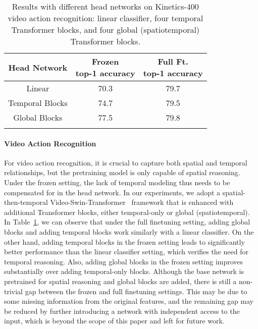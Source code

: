 \documentclass{article}
\begin{document}
\begin{table}[h]
        \centering
\addtolength{\tabcolsep}{3.0pt}
        \begin{tabular}{c|cc}
            \Xhline{1.0pt}
            Head Network& \makecell{Frozen\\top-1 accuracy} & \makecell{Full Ft.\\top-1 accuracy}\\
            \hline
            Linear & 70.3 & 79.7 \\
             Temporal Blocks & 74.7 & 79.5 \\
             Global Blocks & 77.5 & 79.8 \\
          \Xhline{1.0pt}  
       \end{tabular}
       \caption{Results with different head networks on Kinetics-400 video action recognition: linear classifier, four temporal Transformer blocks, and four global (spatiotemporal) Transformer blocks.}
    \label{tab:param_at_head_k400}
\end{table}

\paragraph{Video Action Recognition}
For video action recognition, it is crucial to capture both spatial and temporal relationships, but the pretraining model is only capable of spatial reasoning. Under the frozen setting, the lack of temporal modeling thus needs to be compensated for in the head network. In our experiments, we adopt a spatial-then-temporal Video-Swin-Transformer~\cite{liu2021video} framework that is enhanced with additional Transformer blocks, either temporal-only or global (spatiotemporal). In Table~\ref{tab:param_at_head_k400}, we can observe that under the full finetuning setting, adding global blocks and adding temporal blocks work similarly with a linear classifier. On the other hand, adding temporal blocks in the frozen setting leads to significantly better performance than the linear classifier setting, which verifies the need for temporal reasoning. Also, adding global blocks in the frozen setting improves substantially over adding temporal-only blocks. Although the base network is pretrained for spatial reasoning and global blocks are added, there is still a non-trivial gap between the frozen and full finetuning settings. This may be due to some missing information from the original features, and the remaining gap may be reduced by further introducing a network with independent access to the input, which is beyond the scope of this paper and left for future work.
\end{document}
